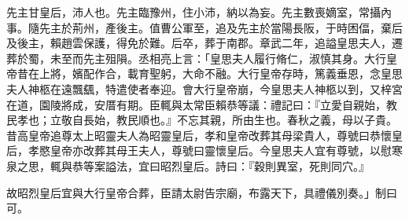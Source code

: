 \begin{pinyinscope}
 
 
 先主甘皇后，沛人也。先主臨豫州，住小沛，納以為妄。先主數喪嫡室，常攝內事。隨先主於荊州，產後主。值曹公軍至，追及先主於當陽長阪，于時困偪，棄后及後主，賴趙雲保護，得免於難。后卒，葬于南郡。章武二年，追謚皇思夫人，遷葬於蜀，未至而先主殂隕。丞相亮上言：「皇思夫人履行脩仁，淑慎其身。大行皇帝昔在上將，嬪配作合，載育聖躬，大命不融。大行皇帝存時，篤義垂恩，念皇思夫人神柩在遠飄颻，特遣使者奉迎。會大行皇帝崩，今皇思夫人神柩以到，又梓宮在道，園陵將成，安厝有期。臣輒與太常臣賴恭等議：禮記曰：『立愛自親始，教民孝也；立敬自長始，教民順也。』不忘其親，所由生也。春秋之義，母以子貴。昔高皇帝追尊太上昭靈夫人為昭靈皇后，孝和皇帝改葬其母梁貴人，尊號曰恭懷皇后，孝愍皇帝亦改葬其母王夫人，尊號曰靈懷皇后。今皇思夫人宜有尊號，以慰寒泉之思，輒與恭等案謚法，宜曰昭烈皇后。詩曰：『穀則異室，死則同穴。』
 
 
 故昭烈皇后宜與大行皇帝合葬，臣請太尉告宗廟，布露天下，具禮儀別奏。」制曰可。
 
 
\end{pinyinscope}